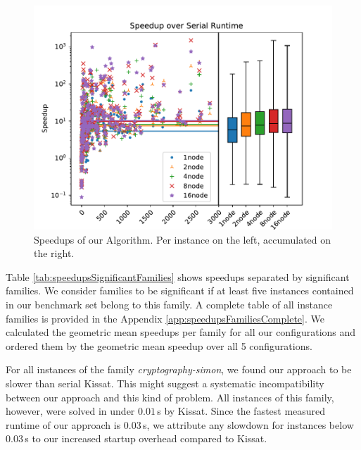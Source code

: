 \documentclass[12pt,a4paper,twoside]{scrartcl}
\numberwithin{equation}{section}
\begin{document}
\begin{figure}
  \center
  \includegraphics{plots/speedups_gim.pdf}
  \caption{Speedups of our Algorithm. Per instance on the left, accumulated on the right.}
  \label{fig:speedups}
\end{figure}


Table \ref{tab:speedupsSignificantFamilies} shows speedups separated by significant families. We consider families to be significant if at least five instances contained in our benchmark set belong to this family. A complete table of all instance families is provided in the Appendix \ref{app:speedupsFamiliesComplete}. We calculated the geometric mean speedups per family for all our configurations and ordered them by the geometric mean speedup over all 5 configurations.

For all instances of the family \textit{cryptography-simon}, we found our approach to be slower than serial Kissat. This might suggest a systematic incompatibility between our approach and this kind of problem. All instances of this family, however, were solved in under $0.01\,$s by Kissat. Since the fastest measured runtime of our approach is $0.03\,$s, we attribute any slowdown for instances below $0.03\,$s to our increased startup overhead compared to Kissat.
\end{document}
